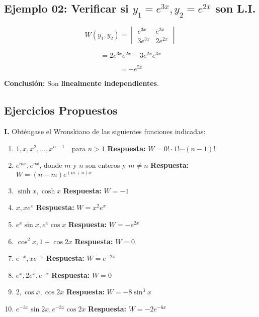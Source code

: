 \subsection{Ejemplo 02: Verificar si \( y_{1} = e^{3x}, y_{2} = e^{2x} \) son L.I.}

\[
W(y_{1}, y_{2}) =
\begin{vmatrix}
e^{3x} & e^{2x}\\
3e^{3x} & 2e^{2x}
\end{vmatrix}
\]

\[
= 2e^{3x} e^{2x} - 3e^{2x} e^{3x}
\]

\[
= -e^{5x}
\]

\textbf{Conclusión:} Son \textbf{linealmente independientes}.


\subsection{Ejercicios Propuestos}

\textbf{I.} Obténgase el Wronskiano de las siguientes funciones indicadas:

\begin{enumerate}
    \item \(1, x, x^2, \dots, x^{n-1} \quad \text{para } n > 1\)  
    \textbf{Respuesta:} \( W = 0! \cdot 1! \cdots (n - 1)! \)

    \item \( e^{mx}, e^{nx} \), donde \( m \) y \( n \) son enteros y \( m \neq n \)  
    \textbf{Respuesta:} \( W = (n - m)e^{(m+n)x} \)

    \item \( \sinh x, \cosh x \)  
    \textbf{Respuesta:} \( W = -1 \)

    \item \( x, xe^x \)  
    \textbf{Respuesta:} \( W = x^2 e^x \)

    \item \( e^x \sin x, e^x \cos x \)  
    \textbf{Respuesta:} \( W = -e^{2x} \)

    \item \( \cos^2 x, 1 + \cos 2x \)  
    \textbf{Respuesta:} \( W = 0 \)

    \item \( e^{-x}, xe^{-x} \)  
    \textbf{Respuesta:} \( W = e^{-2x} \)

    \item \( e^x, 2e^x, e^{-x} \)  
    \textbf{Respuesta:} \( W = 0 \)

    \item \( 2, \cos x, \cos 2x \)  
    \textbf{Respuesta:} \( W = -8 \sin^3 x \)

    \item \( e^{-3x} \sin 2x, e^{-3x} \cos 2x \)  
    \textbf{Respuesta:} \( W = -2 e^{-6x} \)
\end{enumerate}



